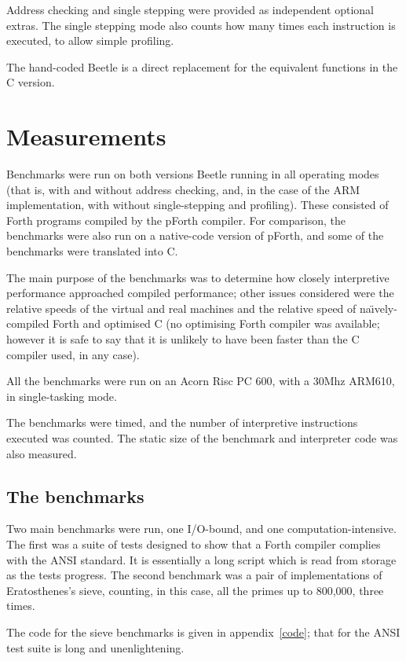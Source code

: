 \documentclass{article}
\begin{document}
Address checking and single stepping were provided as independent optional
extras. The single stepping mode also counts how many times each instruction
is executed, to allow simple profiling.

The hand-coded Beetle is a direct replacement for the equivalent functions in
the C version.


\section{Measurements}

Benchmarks were run on both versions Beetle running in all operating modes
(that is, with and without address checking, and, in the case of the ARM
implementation, with without single-stepping and profiling). These consisted
of Forth programs compiled by the pForth compiler. For comparison, the
benchmarks were also run on a native-code version of pForth, and some of the
benchmarks were translated into C.

The main purpose of the benchmarks was to determine how closely interpretive
performance approached compiled performance; other issues considered were the
relative speeds of the virtual and real machines and the relative speed of
na\"{\i}vely-compiled Forth and optimised C (no optimising Forth compiler was
available; however it is safe to say that it is unlikely to have been faster
than the C compiler used, in any case).

All the benchmarks were run on an Acorn Risc PC 600, with a 30Mhz ARM610, in
single-tasking mode.

The benchmarks were timed, and the number of interpretive instructions
executed was counted. The static size of the benchmark and interpreter code
was also measured.

\subsection{The benchmarks}

Two main benchmarks were run, one I/O-bound, and one computation-intensive.
The first was a suite of tests designed to show that a Forth compiler
complies with the ANSI standard. It is essentially a long script which is
read from storage as the tests progress. The second benchmark was a pair of
implementations of Eratosthenes's sieve, counting, in this case, all the
primes up to 800,000, three times.

The code for the sieve benchmarks is given in appendix~\ref{code}; that for
the ANSI test suite is long and unenlightening.
\end{document}
